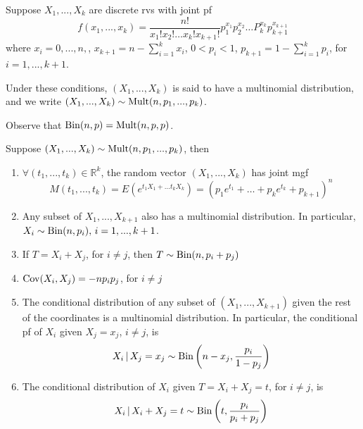 \documentclass[notoc,notitlepage]{tufte-book}
\begin{document}
\begin{defn}
\label{defn:mutlinomial_distribution}
  Suppose $X_1, ..., X_k$ are discrete rvs with joint pf
  \begin{equation*}
    f(x_1, ..., x_k) = \frac{n!}{x_1! x_2! \hdots x_k! x_{k + 1}!} p_1^{x_1} p_2^{x_2} \hdots P_k^{x_k} p_{k + 1}^{x_{k + 1}}
  \end{equation*}
  where $x_i = 0, ..., n,$, $x_{k + 1} = n - \sum_{i=1}^{k} x_i$, $0 < p_i < 1$, $p_{k + 1} = 1 - \sum_{i=1}^{k} p_i$, for $i = 1, ..., k + 1$.

  Under these conditions, $(X_1, ..., X_k)$ is said to have a multinomial distribution, and we write $(X_1, ..., X_k) \sim \operatorname{Mult}(n, p_1, ..., p_k)$.
\end{defn}

\begin{note}
  Observe that $\operatorname{Bin}(n, p) = \operatorname{Mult}(n, p, p)$.
\end{note}

\begin{propo}
\label{propo:properties_of_multinomial_distribution}
  Suppose $(X_1, ..., X_k) \sim \operatorname{Mult}(n, p_1, ..., p_k)$, then
  \begin{enumerate}
    \item $\forall (t_1, ..., t_k) \in \mathbb{R}^k$, the random vector $(X_1, ..., X_k)$ has joint mgf
      \begin{equation*}
        M(t_1, ..., t_k) = E \left( e^{t_1 X_1 + \hdots t_k X_k} \right) = (p_1 e^{t_1} + \hdots + p_k e^{t_k} + p_{k + 1})^n
      \end{equation*}

    \item Any subset of $X_1, ..., X_{k + 1}$ also has a multinomial distribution. In particular, $X_i \sim \operatorname{Bin}(n, p_i), \, i = 1, ..., k + 1$.
    \item If $T = X_i + X_j$, for $i \neq j$, then $T \sim \operatorname{Bin}(n, p_i + p_j)$
    \item $\operatorname{Cov}(X_i, X_j) = -n p_i p_j$, for $i \neq j$
    \item The conditional distribution of any subset of $(X_1, ..., X_{k + 1})$ given the rest of the coordinates is a multinomial distribution. In particular, the conditional pf of $X_i$ given $X_j = x_j$, $i \neq j$, is
      \begin{equation*}
        X_i \, | \, X_j = x_j \sim \operatorname{Bin}\left( n - x_j, \frac{p_i}{1 - p_j} \right)
      \end{equation*}

    \item The conditional distribution of $X_i$ given $T = X_i + X_j = t$, for $i \neq j$, is
      \begin{equation*}
        X_i \, | \, X_i + X_j = t \sim \operatorname{Bin} \left( t, \frac{p_i}{p_i + p_j} \right)
      \end{equation*}
  \end{enumerate}
\end{propo}
\end{document}

